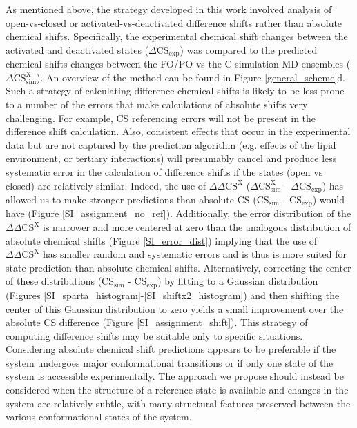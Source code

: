 \documentclass[%
 aip,
 amsmath,amssymb,
 preprint,%
]{revtex4-1}
\begin{document}
As mentioned above, the strategy developed in this work involved analysis of open-vs-closed or activated-vs-deactivated difference shifts rather than absolute chemical shifts.  Specifically, the  experimental chemical shift changes between the activated  and deactivated states ($\Delta\text{CS}_{\text{exp}}$) was compared to the predicted chemical shifts changes between the FO/PO vs the C simulation MD  ensembles ($\Delta\text{CS}_{\text{sim}}^{\text{X}}$).   An overview of the method can be found in Figure \ref{general_scheme}d. Such a strategy of calculating difference chemical shifts is likely to be less prone to a number of the errors  that make calculations of absolute shifts very challenging. For example, CS referencing errors will not be present in the difference shift calculation.  Also, consistent effects that occur in the experimental data but are not captured by the prediction algorithm (e.g. effects of the lipid environment, or tertiary interactions) will presumably cancel and produce less systematic error in the calculation of difference shifts if the states (open vs closed) are relatively similar. Indeed, the use of $\Delta\Delta\text{CS}^{\text{X}}$ ($\Delta\text{CS}_{\text{sim}}^{\text{X}}$ - $\Delta\text{CS}_{\text{exp}}$) has allowed us to make stronger predictions than absolute CS (CS$_{\text{sim}}$ - $\text{CS}_{\text{exp}}$) would have (Figure \ref{SI_assignment_no_ref}). Additionally, the error distribution of the $\Delta\Delta\text{CS}^{\text{X}}$ is narrower and more centered at zero than the analogous distribution of absolute chemical shifts (Figure \ref{SI_error_dist}) implying that the use of $\Delta\Delta\text{CS}^{\text{X}}$ has smaller random and systematic errors and is thus is more suited for state prediction than absolute chemical shifts. Alternatively, correcting the center of these distributions (CS$_{\text{sim}}$ - $\text{CS}_{\text{exp}}$) by fitting to a Gaussian distribution (Figures \ref{SI_sparta_histogram}-\ref{SI_shiftx2_histogram}) and then shifting the center of this Gaussian distribution to zero yields a small improvement over the absolute CS difference (Figure \ref{SI_assignment_shift}). This strategy of computing difference shifts may be suitable only to specific situations. Considering absolute chemical shift predictions appears to be preferable if the system undergoes major conformational transitions or if only one state of the system is accessible experimentally. The approach we propose should instead be considered when the structure of a reference state is available and changes in the system are relatively subtle, with many structural features preserved between the various conformational states of the system. 
\end{document}
